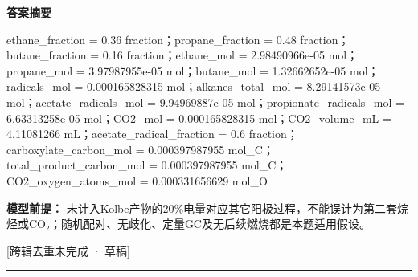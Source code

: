 \documentclass[UTF8,11pt,a4paper]{ctexart}
\begin{document}
\noindent\textbf{答案摘要}\par
ethane\_fraction = 0.36 fraction；propane\_fraction = 0.48 fraction；butane\_fraction = 0.16 fraction；ethane\_mol = 2.98490966e-05 mol；propane\_mol = 3.97987955e-05 mol；butane\_mol = 1.32662652e-05 mol；radicals\_mol = 0.000165828315 mol；alkanes\_total\_mol = 8.29141573e-05 mol；acetate\_radicals\_mol = 9.94969887e-05 mol；propionate\_radicals\_mol = 6.63313258e-05 mol；CO2\_mol = 0.000165828315 mol；CO2\_volume\_mL = 4.11081266 mL；acetate\_radical\_fraction = 0.6 fraction；carboxylate\_carbon\_mol = 0.000397987955 mol\_C；total\_product\_carbon\_mol = 0.000397987955 mol\_C；CO2\_oxygen\_atoms\_mol = 0.000331656629 mol\_O\par
\noindent\textbf{模型前提：}
未计入Kolbe产物的20\%电量对应其它阳极过程，不能误计为第二套烷烃或CO₂；随机配对、无歧化、定量GC及无后续燃烧都是本题适用假设。\par
\noindent\textcolor{red!65!black}{[跨辑去重未完成 · 草稿]} \par
\medskip\hrule\medskip
{}
\end{document}
